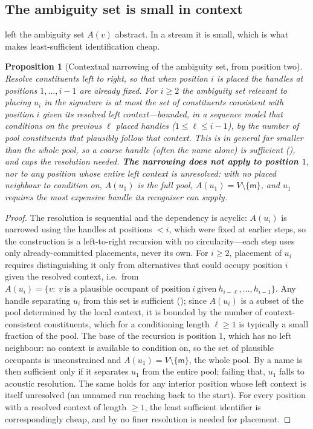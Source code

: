 \documentclass[11pt,twocolumn,a4paper]{article}
\theoremstyle{thmstyle}
\newtheorem{proposition}[theorem]{Proposition}
\theoremstyle{definition}
\theoremstyle{remark}
\newcommand{\V}{V}
\newcommand{\med}{\mathsf{m}}
\newcommand{\hand}{h}
\begin{document}
\subsection{The ambiguity set is small in context}

 left the ambiguity set $A(v)$ abstract. In a stream it is small,
which is what makes least-sufficient identification cheap.

\begin{proposition}[Contextual narrowing of the ambiguity set, from position two]
\label{prop:context}
Resolve constituents left to right, so that when position $i$ is placed the
handles at positions $1,\dots,i-1$ are already fixed. For $i\ge2$ the ambiguity
set relevant to placing $u_i$ in the signature is at most the set of constituents
consistent with position $i$ given its resolved left context---bounded, in a
sequence model that conditions on the previous $\ell$ placed handles
($1\le\ell\le i-1$), by the number of pool constituents that plausibly follow
that context. This is in general far smaller than the whole pool, so a coarse
handle (often the name alone) is sufficient (), and
 caps the resolution needed. \textbf{The narrowing does not
apply to position $1$}, nor to any position whose entire left context is
unresolved: with no placed neighbour to condition on, $A(u_1)$ is the full pool,
$A(u_1)=\V\setminus\{\med\}$, and $u_1$ requires the most expensive handle its
recogniser can supply.
\end{proposition}

\begin{proof}
The resolution is sequential and the dependency is acyclic: $A(u_i)$ is narrowed
using the handles at positions $<i$, which were fixed at earlier steps, so the
construction is a left-to-right recursion with no circularity---each step uses
only already-committed placements, never its own. For $i\ge2$, placement of
$u_i$ requires distinguishing it only from alternatives that could occupy
position $i$ given the resolved context, i.e.\ from
$A(u_i)=\{v:\ v\ \text{is a plausible occupant of position}\ i\ \text{given}\
\hand_{i-\ell},\dots,\hand_{i-1}\}$. Any handle separating $u_i$ from this set is
sufficient (\Cref{def:lsi}); since $A(u_i)$ is a subset of the pool determined by
the local context, it is bounded by the number of context-consistent
constituents, which for a conditioning length $\ell\ge1$ is typically a small
fraction of the pool. The base of the recursion is position $1$, which has no
left neighbour: no context is available to condition on, so the set of plausible
occupants is unconstrained and $A(u_1)=\V\setminus\{\med\}$, the whole pool. By
\Cref{cor:name-first} a name is then sufficient only if it separates $u_1$ from
the entire pool; failing that, $u_1$ falls to acoustic resolution. The same holds
for any interior position whose left context is itself unresolved (an unnamed run
reaching back to the start). For every position with a resolved context of length
$\ge1$, the least sufficient identifier is correspondingly cheap, and by
\Cref{thm:sufficiency} no finer resolution is needed for placement.
\end{proof}
\end{document}

